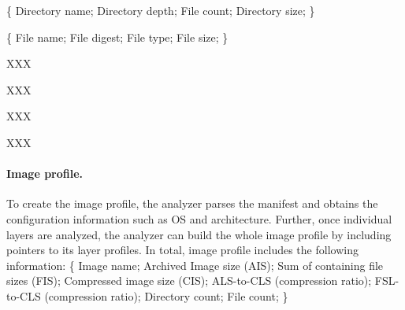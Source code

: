 \{
Directory name;
Directory depth;
File count;
Directory size;
\}

\{
File name;
File digest;
File type;
File size;
\}

\begin{compactitemize}
	\item XXX
	\item XXX
	\item XXX
	\item XXX
\end{compactitemize}



%
%


\paragraph{Image profile.}

To create the image profile, the analyzer parses the manifest
and obtains the configuration information such as OS and architecture.
Further, once individual layers are analyzed, the analyzer can build the whole image
profile by including pointers to its layer profiles. In total, image profile includes
the following information:
\{
Image name; 
Archived Image size (AIS); 
Sum of containing file sizes (FIS); 
Compressed image size (CIS); 
ALS-to-CLS (compression ratio);
FSL-to-CLS (compression ratio);
Directory count;
File count;
\}

